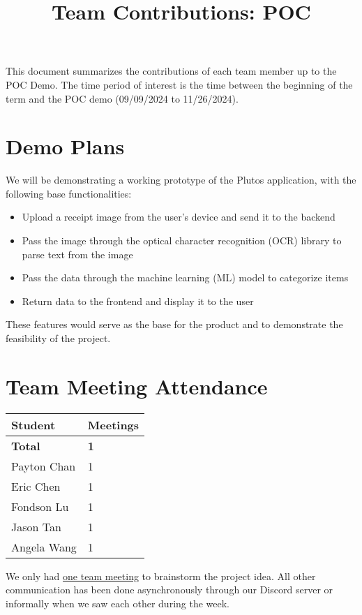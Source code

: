 \documentclass{article}
\title{Team Contributions: POC\\\progname}
\author{\authname}
\date{}
\begin{document}
\maketitle

This document summarizes the contributions of each team member up to the POC
Demo.  The time period of interest is the time between the beginning of the term
and the POC demo (09/09/2024 to 11/26/2024).

\section{Demo Plans}

We will be demonstrating a working prototype of the Plutos application, with the
following base functionalities:
\begin{itemize}
    \item Upload a receipt image from the user's device and send it to the
    backend
    \item Pass the image through the optical character recognition (OCR) library
    to parse text from the image
    \item Pass the data through the machine learning (ML) model to categorize
    items
    \item Return data to the frontend and display it to the user
\end{itemize}

These features would serve as the base for the product and to demonstrate the
feasibility of the project.

\section{Team Meeting Attendance}

\begin{table}[H]
\centering
\begin{tabular}{ll}
\toprule
\textbf{Student} & \textbf{Meetings}\\
\midrule
\textbf{Total} & \textbf{1}\\
Payton Chan & 1\\
Eric Chen & 1\\
Fondson Lu & 1\\
Jason Tan & 1\\
Angela Wang & 1\\
\bottomrule
\end{tabular}
\end{table}

We only had \href{https://github.com/PlutosCapstone/Plutos/issues/9}{one team
meeting} to brainstorm the project idea. All other communication has been done
asynchronously through our Discord server or informally when we saw each other
during the week.
\end{document}
